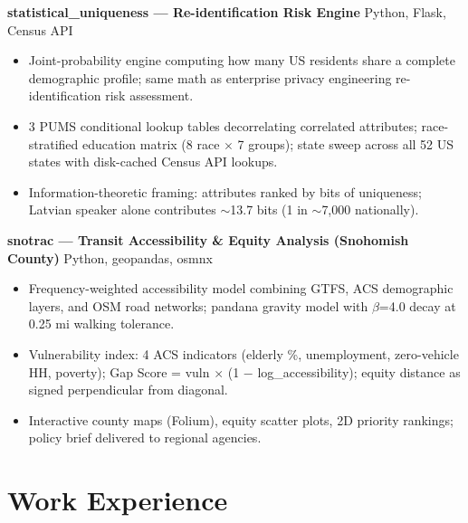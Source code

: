 \documentclass[11pt,a4paper]{article}
\begin{document}
\vspace{0.2cm}
\noindent
\textbf{statistical\_uniqueness --- Re-identification Risk Engine} \hfill Python, Flask, Census API
\begin{itemize}
    \item Joint-probability engine computing how many US residents share a complete demographic profile; same math as enterprise privacy engineering re-identification risk assessment.
    \item 3 PUMS conditional lookup tables decorrelating correlated attributes; race-stratified education matrix (8 race $\times$ 7 groups); state sweep across all 52 US states with disk-cached Census API lookups.
    \item Information-theoretic framing: attributes ranked by bits of uniqueness; Latvian speaker alone contributes $\sim$13.7 bits (1 in $\sim$7,000 nationally).
\end{itemize}

\vspace{0.2cm}
\noindent
\textbf{snotrac --- Transit Accessibility \& Equity Analysis (Snohomish County)} \hfill Python, geopandas, osmnx
\begin{itemize}
    \item Frequency-weighted accessibility model combining GTFS, ACS demographic layers, and OSM road networks; pandana gravity model with $\beta$=4.0 decay at 0.25 mi walking tolerance.
    \item Vulnerability index: 4 ACS indicators (elderly \%, unemployment, zero-vehicle HH, poverty); Gap Score = vuln $\times$ (1 $-$ log\_accessibility); equity distance as signed perpendicular from diagonal.
    \item Interactive county maps (Folium), equity scatter plots, 2D priority rankings; policy brief delivered to regional agencies.
\end{itemize}

\section*{Work Experience}
\end{document}
